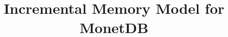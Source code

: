 \documentclass[]{beamer}
\title{Incremental Memory Model for MonetDB}
\begin{document}
\begin{frame}[plain]
	\titlepage
\end{frame}



% 
% 
% 

%     
%     

% 
\end{document}
